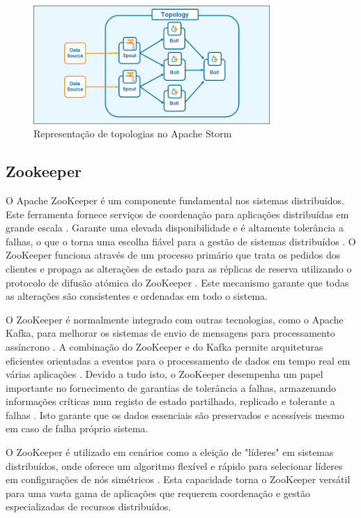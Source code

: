 \begin{figure}[H]
    \centering
    \includegraphics[width=0.8\textwidth]{media/content/estado-arte/apache-storm-topology-diagram.png}
    \caption{Representação de topologias no Apache Storm}
    \label{fig:topologies}
\end{figure}

\subsection{Zookeeper}

O Apache ZooKeeper é um componente fundamental nos sistemas distribuídos. Este ferramenta
fornece serviços de coordenação para aplicações distribuídas em grande escala \cite{zookeeper2018}. 
Garante uma elevada disponibilidade e é altamente tolerância a falhas, o que o torna uma escolha 
fiável para a gestão de sistemas distribuídos \cite{zookeeper2021}. O ZooKeeper funciona através de 
um processo primário que trata os pedidos dos clientes e propaga as alterações de estado para as 
réplicas de reserva utilizando o protocolo de difusão atómica do ZooKeeper \cite{zookeeper2011}. 
Este mecanismo garante que todas as alterações são consistentes e ordenadas em todo o sistema.

O ZooKeeper é normalmente integrado com outras tecnologias, como o Apache Kafka, para melhorar os 
sistemas de envio de mensagens para processamento assíncrono \cite{zookeeper2024}. A combinação do 
ZooKeeper e do Kafka permite arquiteturas eficientes orientadas a eventos para o processamento de 
dados em tempo real em várias aplicações \cite{zookeeper2021b}. Devido a tudo isto, o ZooKeeper 
desempenha um papel importante no fornecimento de garantias de tolerância a falhas, armazenando 
informações críticas num registo de estado partilhado, replicado e tolerante a falhas
\cite{zookeeper2017}. Isto garante que os dados essenciais são preservados e acessíveis mesmo
em caso de falha próprio sistema.

O ZooKeeper é utilizado em cenários como a eleição de "líderes" em sistemas distribuídos, onde 
oferece um algoritmo flexível e rápido para selecionar líderes em configurações de nós simétricos 
\cite{zookeeper2021c}. Esta capacidade torna o ZooKeeper versátil para uma vasta gama de aplicações 
que requerem coordenação e gestão especializadas de recursos distribuídos.


